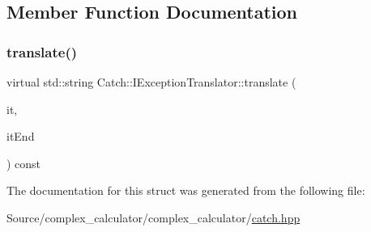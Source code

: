 \subsection{Member Function Documentation}
\mbox{\label{struct_catch_1_1_i_exception_translator_a2a554b96ed5ed411e7c796b6b42837a5}} 
\subsubsection{\texorpdfstring{translate()}{translate()}}
{\footnotesize\ttfamily virtual std\+::string Catch\+::\+I\+Exception\+Translator\+::translate (\begin{DoxyParamCaption}\item[{Exception\+Translators\+::const\+\_\+iterator}]{it,  }\item[{Exception\+Translators\+::const\+\_\+iterator}]{it\+End }\end{DoxyParamCaption}) const\hspace{0.3cm}{\ttfamily [pure virtual]}}



The documentation for this struct was generated from the following file\+:\begin{DoxyCompactItemize}
\item 
Source/complex\+\_\+calculator/complex\+\_\+calculator/\mbox{\hyperlink{catch_8hpp}{catch.\+hpp}}\end{DoxyCompactItemize}
